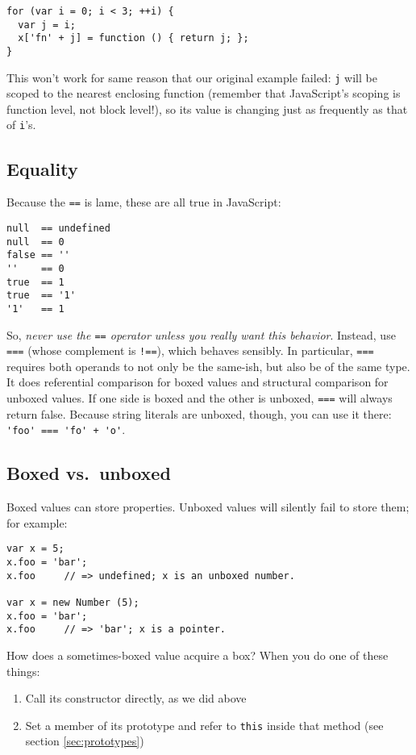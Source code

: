 \documentclass{article}
\begin{document}
\begin{verbatim}
for (var i = 0; i < 3; ++i) {
  var j = i;
  x['fn' + j] = function () { return j; };
}
\end{verbatim}

    This won't work for same reason that our original example failed: \verb|j| will be scoped to the nearest enclosing function (remember that JavaScript's scoping is function level, not block
    level!), so its value is changing just as frequently as that of \verb|i|'s.

\subsection {Equality}
    Because the \verb|==| is lame, these are all true in JavaScript:

\begin{verbatim}
null  == undefined
null  == 0
false == ''
''    == 0
true  == 1
true  == '1'
'1'   == 1
\end{verbatim}

    So, {\it never use the {\tt ==} operator unless you really want this behavior}. Instead, use \verb|===| (whose complement is \verb|!==|), which behaves sensibly. In particular, \verb|===|
    requires both operands to not only be the same-ish, but also be of the same type. It does referential comparison for boxed values and structural comparison for unboxed values. If one side
    is boxed and the other is unboxed, \verb|===| will always return false. Because string literals are unboxed, though, you can use it there: \verb|'foo' === 'fo' + 'o'|.

\subsection {Boxed vs.~unboxed}
    \label{sec:boxing}
    Boxed values can store properties. Unboxed values will silently fail to store them; for example:

\begin{verbatim}
var x = 5;
x.foo = 'bar';
x.foo     // => undefined; x is an unboxed number.

var x = new Number (5);
x.foo = 'bar';
x.foo     // => 'bar'; x is a pointer.
\end{verbatim}

    How does a sometimes-boxed value acquire a box? When you do one of these things:

\begin{enumerate}
\item Call its constructor directly, as we did above
\item Set a member of its prototype and refer to \verb|this| inside that method (see section \ref{sec:prototypes})
\end{enumerate}
\end{document}
